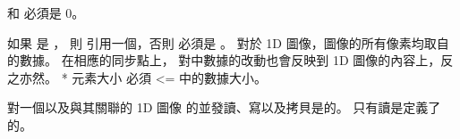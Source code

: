  和  必須是 0。

如果  是 ，
則  引用一個，否則  必須是 。
對於 1D 圖像，圖像的所有像素均取自的數據。
在相應的同步點上，
對中數據的改動也會反映到 1D 圖像的內容上，反之亦然。
 * 元素大小 必須 <= 中的數據大小。

\startnotepar
對一個以及與其關聯的 1D 圖像
的並發讀、寫以及拷貝是的。
只有讀是定義了的。
\stopnotepar

